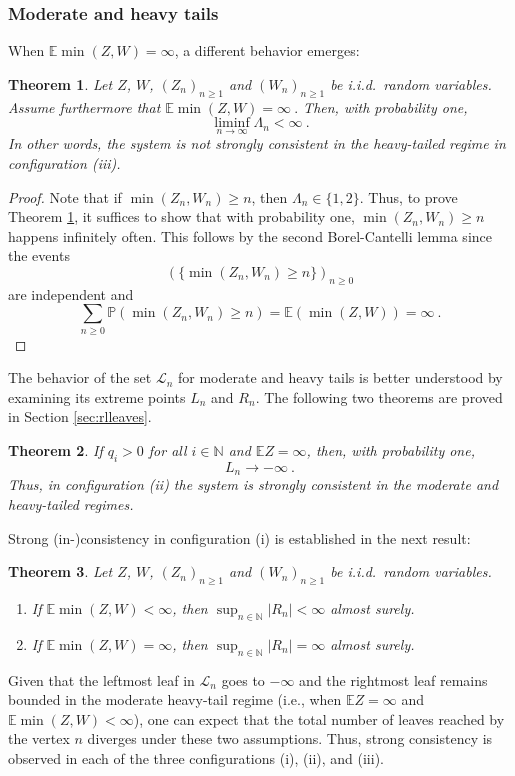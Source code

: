 \documentclass[12pt]{article}
\newcommand{\N}{\mathbb{N}}
\newcommand{\E}{\mathbb{E}}
\newtheorem{theorem}{Theorem}
\numberwithin{equation}{section} \font\titre=cmbx12
\newcommand{\prob}[1]{\mathbb{P}\left( #1 \right)}
\newcommand{\Lset}{\mathcal{L}} %
\newcommand{\leftmost}{L}
\newcommand{\rightmost}{R}
\newcommand{\leaves}{\Lambda}
\begin{document}
\subsubsection*{Moderate and heavy tails}
When $\E \min (Z,W) = \infty$, a different behavior emerges:

\begin{theorem}\label{a.s. thm Emin=infty}
    Let $Z$, $W$, $(Z_n)_{n\ge 1}$ and $(W_n)_{n\ge 1}$ be i.i.d.\
    random variables. Assume furthermore that $\E \min (Z,W) =
    \infty~.$ Then, with probability one,
  $$
  \liminf_{n\to \infty} \leaves_n < \infty~.
  $$
In other words, the system is not strongly consistent in the
heavy-tailed regime in configuration (iii).
  \end{theorem}

\begin{proof}
    Note that if $\min (Z_n, W_n) \ge n$, then $\leaves_n\in \{1,2\}$. Thus,
    to prove Theorem \ref{a.s. thm Emin=infty}, it suffices to show
    that with probability one, $\min(Z_n,W_n) \ge n$ happens
    infinitely often. This follows by the second Borel-Cantelli lemma since the events 
    $$(\{\min(Z_n, W_n)\ge n\})_{n\ge 0}$$
    are independent and 
    $$\sum_{n\ge 0} \prob{\min(Z_n, W_n)\ge n} = \E \left( \min (Z, W) \right)=\infty~.$$
\end{proof}


The behavior of the set $\Lset_n$ for moderate and heavy tails is
better understood by examining its extreme points $\leftmost_n$ and $\rightmost_n$.
The following two theorems are proved in Section \ref{sec:rlleaves}.


\begin{theorem} \label{M diverges a.s. }
    If $q_i>0$ for all $i\in \N$ and $\E Z=\infty$, then, with
    probability one, $$\leftmost_n\to -\infty~.$$
Thus, in configuration (ii) the system is strongly consistent in the
moderate and heavy-tailed regimes.
    \end{theorem}

Strong (in-)consistency in configuration (i) is established in the
next result:


\begin{theorem}\label{a.s thm Emin<infty}
    Let $Z$, $W$, $(Z_n)_{n\ge 1}$ and $(W_n)_{n\ge 1}$ be i.i.d.\ random variables. 
    \begin{enumerate}%
        \item If $\E \min(Z,W)<\infty$, then $\sup_{n\in\N} |\rightmost_n| < \infty$  almost surely.
        \item If $\E \min(Z,W) = \infty$, then $\sup_{n\in\N} |\rightmost_n| = \infty$ almost surely.
    \end{enumerate}
    
\end{theorem}
Given that the leftmost leaf in $\Lset_n$ goes to $-\infty$ and the rightmost leaf remains bounded in the moderate heavy-tail regime (i.e., when $\E Z = \infty$ and $\E \min(Z,W)<\infty$), one can expect that the total number of leaves reached by the vertex $n$ diverges under these two assumptions. Thus, strong consistency is observed in each of the three configurations (i), (ii), and (iii).
\end{document}
